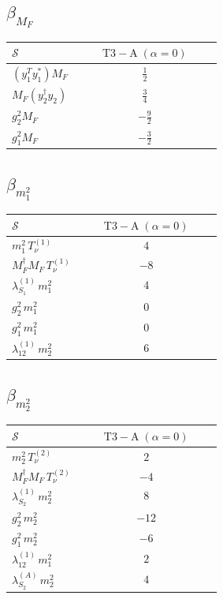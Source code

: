 \documentclass[9pt]{article}
\begin{document}
\subsection*{$ \beta_{M_F} $}
\begin{longtable}{@{}p{0.31\linewidth}c@{}}
\toprule
$\mathcal{S}$ & $ \mathrm{T3-A}\;(\alpha=0) $ \\
\midrule
$ (y_1^T y_1^*)M_F $ & $ \frac{1}{2} $ \\
$ M_F(y_2^\dagger y_2) $ & $ \frac{3}{4} $ \\
$ g_2^2M_F $ & $ - \frac{9}{2} $ \\
$ g_1^2M_F $ & $ - \frac{3}{2} $ \\
\bottomrule
\end{longtable}
\subsection*{$ \beta_{m_1^{2}} $}
\begin{longtable}{@{}p{0.31\linewidth}c@{}}
\toprule
$\mathcal{S}$ & $ \mathrm{T3-A}\;(\alpha=0) $ \\
\midrule
$ m_1^{2}\,T_{\nu}^{(1)} $ & $ 4 $ \\
$ M_F^\dagger M_F\,T_{\nu}^{(1)} $ & $ -8 $ \\
$ \lambda_{S_1}^{(1)}\,m_1^{2} $ & $ 4 $ \\
$ g_2^2\,m_1^{2} $ & $ 0 $ \\
$ g_1^2\,m_1^{2} $ & $ 0 $ \\
$ \lambda_{12}^{(1)}\,m_2^{2} $ & $ 6 $ \\
\bottomrule
\end{longtable}
\subsection*{$ \beta_{m_2^{2}} $}
\begin{longtable}{@{}p{0.31\linewidth}c@{}}
\toprule
$\mathcal{S}$ & $ \mathrm{T3-A}\;(\alpha=0) $ \\
\midrule
$ m_2^{2}\,T_{\nu}^{(2)} $ & $ 2 $ \\
$ M_F^\dagger M_F\,T_{\nu}^{(2)} $ & $ -4 $ \\
$ \lambda_{S_2}^{(1)}\,m_2^{2} $ & $ 8 $ \\
$ g_2^2\,m_2^{2} $ & $ -12 $ \\
$ g_1^2\,m_2^{2} $ & $ -6 $ \\
$ \lambda_{12}^{(1)}\,m_1^{2} $ & $ 2 $ \\
$ \lambda_{S_2}^{(A)}\,m_2^{2} $ & $ 4 $ \\
\bottomrule
\end{longtable}
\end{document}
